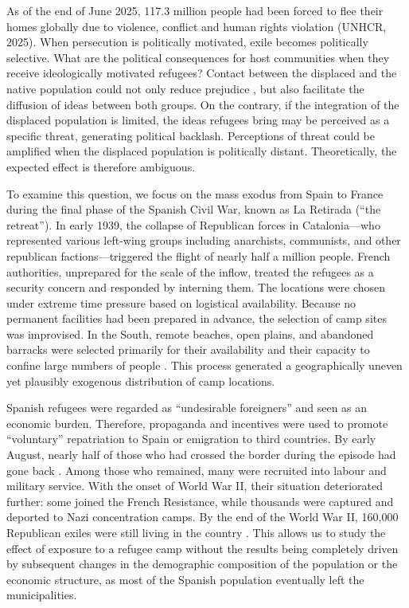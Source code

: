 
As of the end of June 2025, 117.3 million people had been forced to flee their homes globally due to violence, conflict and human rights violation (UNHCR, 2025). When persecution is politically motivated, exile becomes politically selective. What are the political consequences for host communities when they receive ideologically motivated refugees? Contact between the displaced and the native population could not only reduce prejudice \citep{allport1954prejudice}, but also facilitate the diffusion of ideas between both groups. On the contrary, if the integration of the displaced population is limited, the ideas refugees bring may be perceived as a specific threat, generating political backlash. Perceptions of threat could be amplified when the displaced population is politically distant. Theoretically, the expected effect is therefore ambiguous.


To examine this question, we focus on the mass exodus from Spain to France during the final phase of the Spanish Civil War, known as La Retirada (``the retreat”). In early 1939, the collapse of Republican forces in Catalonia—who represented various left-wing groups including anarchists, communists, and other republican factions—triggered the flight of nearly half a million people. French authorities, unprepared for the scale of the inflow, treated the refugees as a security concern and responded by interning them. The locations were chosen under extreme time pressure based on logistical availability. Because no permanent facilities had been prepared in advance, the selection of camp sites was improvised. In the South, remote beaches, open plains, and abandoned barracks were selected primarily for their availability and their capacity to confine large numbers of people \citep{Coignard2012, dreyfus-armand_refugies_2016}. This process generated a geographically uneven yet plausibly exogenous distribution of camp locations.

Spanish refugees were regarded as ``undesirable foreigners” and seen as an economic burden. Therefore, propaganda and incentives were used to promote ``voluntary” repatriation to Spain or emigration to third countries. By early August, nearly half of those who had crossed the border during the episode had gone back \citep{perez_rodriguez_indeseables_2022}. Among those who remained, many were recruited into labour and military service. With the onset of World War II, their situation deteriorated further: some joined the French Resistance, while thousands were captured and deported to Nazi concentration camps. By the end of the World War II, 160,000 Republican exiles were still living in the country \citep{Coignard2012}. This allows us to study the effect of exposure to a refugee camp without the results being completely driven by subsequent changes in the demographic composition of the population or the economic structure, as most of the Spanish population eventually left the municipalities.

